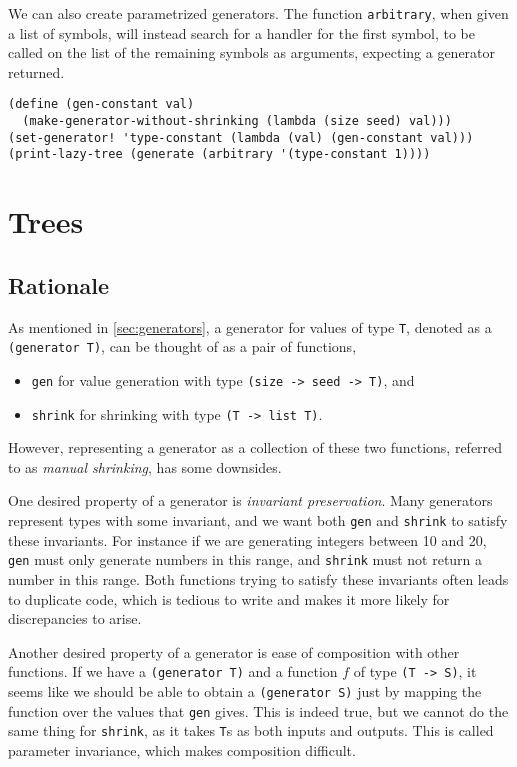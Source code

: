 \documentclass{scrartcl}
\begin{document}
We can also create parametrized generators. The function \verb|arbitrary|, when
given a list of symbols, will instead search for a handler for the first symbol,
to be called on the list of the remaining symbols as arguments, expecting a
generator returned.

\begin{verbatim}
(define (gen-constant val)
  (make-generator-without-shrinking (lambda (size seed) val)))
(set-generator! 'type-constant (lambda (val) (gen-constant val)))
(print-lazy-tree (generate (arbitrary '(type-constant 1))))
\end{verbatim}


\section{Trees}\label{sec:trees}
\subsection{Rationale}
As mentioned in \cref{sec:generators}, a generator for values of type \verb|T|,
denoted as a \verb|(generator T)|,
can be thought of as a pair of functions,
\begin{itemize}
  \item \verb|gen| for value generation
        with type \verb|(size -> seed -> T)|, and
  \item \verb|shrink| for shrinking with type \verb|(T -> list T)|.
\end{itemize}
However, representing a generator as a collection of these two functions,
referred to as \emph{manual shrinking}, has some downsides.

One desired property of a generator is \emph{invariant preservation}.
Many generators represent types with some invariant,
and we want both \verb|gen| and \verb|shrink| to satisfy these invariants.
For instance if we are generating integers between 10 and 20,
\verb|gen| must only generate numbers in this range,
and \verb|shrink| must not return a number in this range.
Both functions trying to satisfy these invariants
often leads to duplicate code, which is tedious to write and
makes it more likely for discrepancies to arise.

Another desired property of a generator is
ease of composition with other functions.
If we have a \verb|(generator T)| and a function \(f\) of type \verb|(T -> S)|,
it seems like we should be able to obtain a \verb|(generator S)| just by
mapping the function over the values that \verb|gen| gives.
This is indeed true, but we cannot do the same thing for \verb|shrink|,
as it takes \verb|T|s as both inputs and outputs.
This is called parameter invariance, which makes composition difficult.
\end{document}
